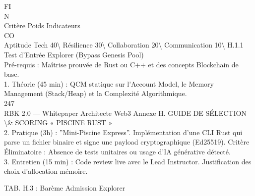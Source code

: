 \documentclass[12pt,landscape,a4paper]{article}
\begin{document}
FI\\
N\\
Critère           Poids Indicateurs\\
CO\\
Aptitude Tech     40\textbackslash{}%
Résilience        30\textbackslash{}%
Collaboration     20\textbackslash{}%
Communication 10\textbackslash{}%
\vspace{0.5em}
\vspace{0.5em}
\vspace{0.5em}
\vspace{0.5em}
H.1.1 Test d’Entrée Explorer (Bypass Genesis Pool)\\
Pré-requis : Maîtrise prouvée de Rust ou C++ et des concepts Blockchain de base.\\
\vspace{0.5em}
1. Théorie (45 min) : QCM statique sur l’Account Model, le Memory Management (Stack/Heap) et la Complexité Algorithmique.\\
\vspace{0.5em}
\vspace{0.5em}
\vspace{0.5em}
247\\
RBK 2.0 — Whitepaper Architecte Web3                                                             Annexe H. GUIDE DE SÉLECTION \textbackslash{}& SCORING « PISCINE RUST »\\
\vspace{0.5em}
\vspace{0.5em}
2. Pratique (3h) : ”Mini-Piscine Express”. Implémentation d’une CLI Rust qui parse un fichier binaire et signe une payload cryptographique (Ed25519). Critère\\
Éliminatoire : Absence de tests unitaires ou usage d’IA générative détecté.\\
\vspace{0.5em}
3. Entretien (15 min) : Code review live avec le Lead Instructor. Justification des choix d’allocation mémoire.\\
\vspace{0.5em}
\vspace{0.5em}
\begin{center}\begin{tabular}TAB. H.3 : Barème Admission Explorer\end{tabular}\end{center}
\end{document}
